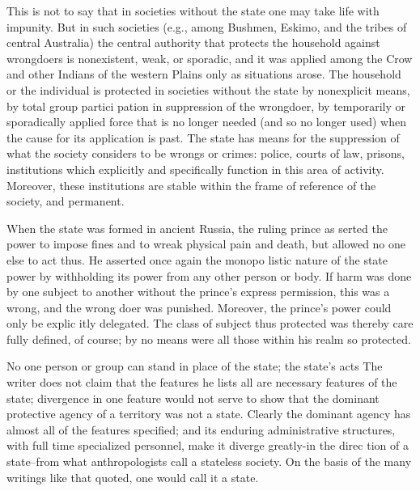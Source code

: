 \documentclass[11pt,openany]{book}
\begin{document}
This is not to say that in societies without the state one may take life with impunity. But in such societies (e.g., among Bushmen, Eskimo, and the tribes of central Australia) the central authority that protects the household against wrongdoers is nonexistent, weak, or sporadic, and it was applied among the Crow and other Indians of the western Plains only as situations arose. The household or the individual is protected in societies without the state by nonexplicit means, by total group partici pation in suppression of the wrongdoer, by temporarily or sporadically applied force that is no longer needed (and so no longer used) when the cause for its application is past. The state has means for the suppression of what the society considers to be wrongs or crimes: police, courts of law, prisons, institutions which explicitly and specifically function in this area of activity. Moreover, these institutions are stable within the frame of reference of the society, and permanent. 

When the state was formed in ancient Russia, the ruling prince as serted the power to impose fines and to wreak physical pain and death, but allowed no one else to act thus. He asserted once again the monopo listic nature of the state power by withholding its power from any other person or body. If harm was done by one subject to another without the prince's express permission, this was a wrong, and the wrong doer was punished. Moreover, the prince's power could only be explic itly delegated. The class of subject thus protected was thereby care fully defined, of course; by no means were all those within his realm so protected. 

No one person or group can stand in place of the state; the state's acts The writer does not claim that the features he lists all are necessary features of the state; divergence in one feature would not serve to show that the dominant protective agency of a territory was not a state. Clearly the dominant agency has almost all of the features specified; and its enduring administrative structures, with full time specialized personnel, make it diverge greatly-in the direc tion of a state--from what anthropologists call a stateless society. On the basis of the many writings like that quoted, one would call it a state. 
\end{document}

